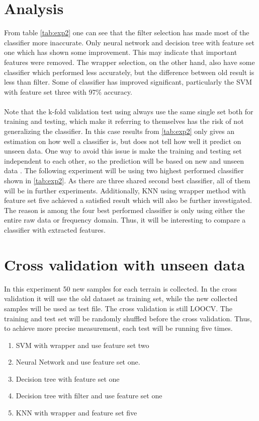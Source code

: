 \documentclass[USenglish]{ifimaster}  %
\begin{document}
\section{Analysis}
From table \ref{tab:exp2} one can see that the filter selection has made most of the classifier more inaccurate. Only neural network and decision tree with feature set one which has shown some improvement. This may indicate that important features were removed. The wrapper selection, on the other hand, also have some classifier which performed less accurately, but the difference between old result is less than filter. Some of classifier has improved significant, particularly the SVM with feature set three with 97\% accuracy.
\\
\\
Note that the k-fold validation test using always use the same single set both for training and testing, which make it referring to themselves has the risk of not generalizing the classifier. In this case results from \ref{tab:exp2} only gives an estimation on how well a classifier is, but does not tell how well it predict on unseen data. One way to avoid this issue is make the training and testing set independent to each other, so the prediction will be based on new and unseen data \cite{26b23e912c654fe4b7478fd910130195}. The following experiment will be using two highest performed classifier shown in \ref{tab:exp2}. As there are three shared second best classifier, all of them will be in further experiments. Additionally, KNN using wrapper method with feature set five achieved a satisfied result which will also be further investigated. The reason is among the four best performed classifier is only using either the entire raw data or frequency domain. Thus, it will be interesting to compare a classifier with extracted features.

\section{Cross validation with unseen data} \label{seq:crossunseen}
In this experiment 50 new samples for each terrain is collected. In the cross validation it will use the old dataset as training set, while the new collected samples will be used as test file. The cross validation is still LOOCV. The training and test set will be randomly shuffled before the cross validation. Thus, to achieve more precise measurement, each test will be running five times.

\begin{enumerate}
\item SVM with wrapper and use feature set two
\item Neural Network and use feature set one.
\item Decision tree with feature set one
\item Decision tree with filter and use feature set one
\item KNN with wrapper and feature set five
\end{enumerate}
\end{document}
